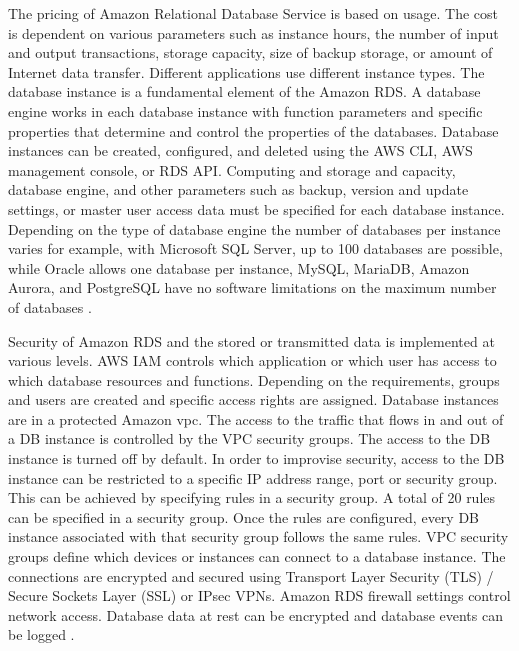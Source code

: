 \par The pricing of Amazon Relational Database Service is based on usage.
The cost is dependent on various parameters such as instance hours, the number of input and output transactions, storage capacity, size of backup storage, or amount of Internet data transfer.
Different applications use different instance types.
The database instance is a fundamental element of the
Amazon RDS. A database engine works in each database
instance with function parameters and specific properties
that determine and control the properties of the
databases.
Database instances can be created, configured,
and deleted using the AWS CLI, AWS management console, or
RDS API. Computing and storage and capacity, database
engine, and other parameters such as backup, version and update settings, or master user access data must be specified for each database instance.
Depending on the type of database engine the number of databases per instance varies for example, with Microsoft SQL Server, up to 100 databases are possible, while Oracle allows one database per instance, MySQL, MariaDB, Amazon Aurora, and PostgreSQL have no software limitations on the maximum number of databases \cite{37}.

\par Security of Amazon RDS and the stored or transmitted data is implemented at various levels.
AWS IAM controls which application or which user has access to which database resources and functions.
Depending on the requirements, groups and users are created and specific access rights are assigned.
Database instances are in a protected Amazon \gls{vpc}.
The access to the traffic that flows in and out of a DB instance is controlled by the VPC security groups.
The access to the DB instance is turned off by default.
In order to improvise security, access to the DB instance can be restricted to a specific IP address range, port or security group.
This can be achieved by specifying rules in a security group.
A total of 20 rules can be specified in a security group.
Once the rules are configured, every DB instance associated with that security group follows the same rules.
VPC security groups define which devices or instances can connect to a database instance.
The connections are encrypted and secured using Transport Layer Security (TLS) / Secure Sockets Layer (SSL) or IPsec VPNs. Amazon RDS firewall settings control network access. Database data at rest can be encrypted and database events can be logged \cite{71}.

